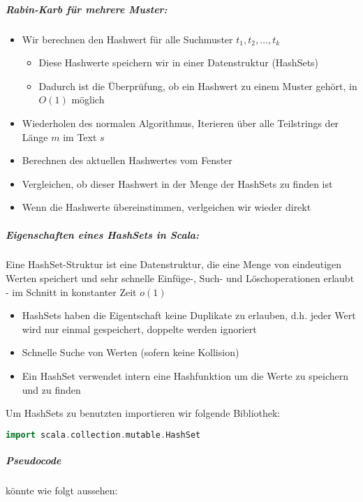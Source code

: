 \subparagraph{Rabin-Karb für mehrere Muster:}\cite{Stackoverflow-Rabin-Karp}
\begin{itemize}
	\item Wir berechnen den Hashwert für alle Suchmuster $t_1,t_2, \dots, t_k$
	\begin{itemize}
		\item Diese Hashwerte speichern wir in einer Datenstruktur (HashSets)
		\item Dadurch ist die Überprüfung, ob ein Hashwert zu einem Muster gehört, in $O(1)$ möglich
	\end{itemize}
	\item Wiederholen des normalen Algorithmus, Iterieren über alle Teilstrings der Länge $m$ im Text $s$
	\item Berechnen des aktuellen Hashwertes vom Fenster
	\item Vergleichen, ob dieser Hashwert in der Menge der HashSets zu finden ist
	\item Wenn die Hashwerte übereinstimmen, verlgeichen wir wieder direkt
\end{itemize}

\subparagraph{Eigenschaften eines HashSets in Scala:}

Eine HashSet-Struktur ist eine Datenstruktur, die eine Menge von eindeutigen Werten speichert und sehr schnelle Einfüge-, Such- und Löschoperationen erlaubt - im Schnitt in konstanter Zeit $o(1)$

\begin{itemize}
	\item HashSets haben die Eigentschaft keine Duplikate zu erlauben, d.h. jeder Wert wird nur einmal gespeichert, doppelte werden ignoriert
	\item Schnelle Suche von Werten (sofern keine Kollision)
	\item Ein HashSet verwendet intern eine Hashfunktion um die Werte zu speichern und zu finden
\end{itemize}

\noindent
Um HashSets zu benutzten importieren wir folgende Bibliothek:
\begin{lstlisting}[language=Scala]
import scala.collection.mutable.HashSet
\end{lstlisting}

\subparagraph{Pseudocode} könnte wie folgt aussehen:

